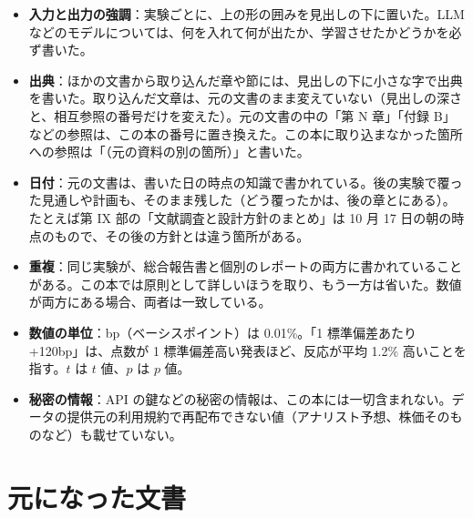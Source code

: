 \begin{itemize}
\item \textbf{入力と出力の強調}：実験ごとに、上の形の囲みを見出しの下に置いた。LLM などのモデルについては、何を入れて何が出たか、学習させたかどうかを必ず書いた。
\item \textbf{出典}：ほかの文書から取り込んだ章や節には、見出しの下に小さな字で出典を書いた。取り込んだ文章は、元の文書のまま変えていない（見出しの深さと、相互参照の番号だけを変えた）。元の文書の中の「第 N 章」「付録 B」などの参照は、この本の番号に置き換えた。この本に取り込まなかった箇所への参照は「（元の資料の別の箇所）」と書いた。
\item \textbf{日付}：元の文書は、書いた日の時点の知識で書かれている。後の実験で覆った見通しや計画も、そのまま残した（どう覆ったかは、後の章とにある）。たとえば第 IX 部の「文献調査と設計方針のまとめ」は 10 月 17 日の朝の時点のもので、その後の方針とは違う箇所がある。
\item \textbf{重複}：同じ実験が、総合報告書と個別のレポートの両方に書かれていることがある。この本では原則として詳しいほうを取り、もう一方は省いた。数値が両方にある場合、両者は一致している。
\item \textbf{数値の単位}：bp（ベーシスポイント）は 0.01\%。「1 標準偏差あたり +120bp」は、点数が 1 標準偏差高い発表ほど、反応が平均 1.2\% 高いことを指す。$t$ は $t$ 値、$p$ は $p$ 値。
\item \textbf{秘密の情報}：API の鍵などの秘密の情報は、この本には一切含まれない。データの提供元の利用規約で再配布できない値（アナリスト予想、株価そのものなど）も載せていない。
\end{itemize}

\section*{元になった文書}

